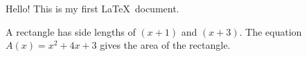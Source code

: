 \documentclass[11pt]{article}
\begin{document}
Hello! This is my first \LaTeX\ document.

A rectangle has side lengths of $(x+1)$ and $(x+3)$.
The equation ${A(x) = x^2+4x+3}$ gives the area of the rectangle.
\end{document}

